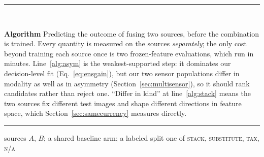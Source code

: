 \begin{table}[pos=htbp]
\label{alg:procedure}
\centering
\begin{minipage}{\columnwidth}
\rule{\linewidth}{0.8pt}\\[1pt]
{\footnotesize\textbf{Algorithm \thealgnum}\hspace{0.6em}Predicting the outcome of fusing two sources, before the
combination is trained. Every quantity is measured on the sources
\emph{separately}; the only cost beyond training each source once is two
frozen-feature evaluations, which run in minutes. Line~\ref{alg:asym} is
the weakest-supported step: it dominates our decision-level fit
(Eq.~\ref{eq:ensgain}), but our two sensor populations differ in modality
as well as in asymmetry (Section~\ref{sec:multisensor}), so it should rank
candidates rather than reject one. ``Differ in kind'' at
line~\ref{alg:stack} means the two sources fix different test images and
shape different directions in feature space, which
Section~\ref{sec:samecurrency} measures directly.\par}
\vspace{1pt}\rule{\linewidth}{0.4pt}\par
\small
\vspace*{-\topsep}\vspace*{4pt}
\renewcommand{\algorithmicand}{\textnormal{and}}
\renewcommand{\algorithmicor}{\textnormal{or}}
\begin{algorithmic}[1]
\REQUIRE sources $A$, $B$; a shared baseline arm; a labeled split
\ENSURE one of \textsc{stack}, \textsc{substitute}, \textsc{tax}, \textsc{n/a}

\end{algorithmic}
\end{minipage}
\end{table}
